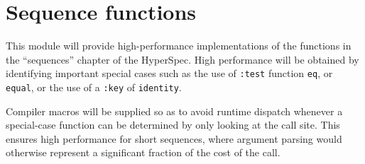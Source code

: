 \chapter{Sequence functions}

This module will provide high-performance implementations of the
functions in the ``sequences'' chapter of the HyperSpec.  High
performance will be obtained by identifying important special cases
such as the use of \texttt{:test} function \texttt{eq}, or
\texttt{equal}, or the use of a \texttt{:key} of \texttt{identity}. 

Compiler macros will be supplied so as to avoid runtime dispatch
whenever a special-case function can be determined by only looking at
the call site.  This ensures high performance for short sequences,
where argument parsing would otherwise represent a significant
fraction of the cost of the call.

